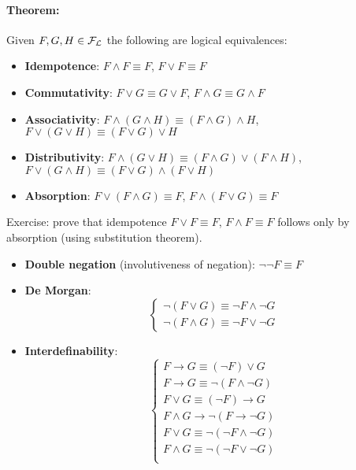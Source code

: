 	\newpage

	\paragraph{Theorem:} Given $F,G,H \in \mathcal{F}_\mathcal{L}$ the following are logical equivalences:
	\begin{itemize}
		\item \textbf{Idempotence}: $F \wedge F \equiv F$, $F \vee F \equiv F$
		\item \textbf{Commutativity}: $F \vee G \equiv G \vee F$, $F \wedge G \equiv G \wedge F$
		\item \textbf{Associativity}: $F \wedge (G \wedge H) \equiv (F \wedge G) \wedge H$, $F \vee (G \vee H) \equiv (F \vee G) \vee H$
		\item \textbf{Distributivity}: $F \wedge (G \vee H) \equiv (F \wedge G) \vee (F \wedge H)$, $F \vee (G \wedge H) \equiv (F \vee G) \wedge (F \vee H)$
		\item \textbf{Absorption}: $F \vee (F \wedge G) \equiv F$, $F \wedge (F \vee G) \equiv F$
	\end{itemize}


	Exercise: prove that idempotence $F \vee F \equiv F$, $F \wedge F \equiv F$ follows only by absorption (using substitution theorem).\\

	\begin{itemize}
		\item \textbf{Double negation} (involutiveness of negation): $\neg \neg F \equiv F$

		\item \textbf{De Morgan}:
		$$ \begin{cases}
			\neg (F \vee G) \equiv \neg F \wedge \neg G \\
			\neg (F \wedge G) \equiv \neg F \vee \neg G
		\end{cases}$$

		\item \textbf{Interdefinability}:
		$$ \begin{cases}
			F \rightarrow G \equiv (\neg F) \vee G  \\
			F \rightarrow G \equiv \neg (F \wedge \neg G) \\
			F \vee G \equiv (\neg F) \rightarrow G \\
			F \wedge G \rightarrow \neg (F \rightarrow \neg G) \\
			F \vee G \equiv \neg (\neg F \wedge \neg G) \\
			F \wedge G \equiv \neg (\neg F \vee \neg G) \\
		\end{cases}$$
	\end{itemize}

